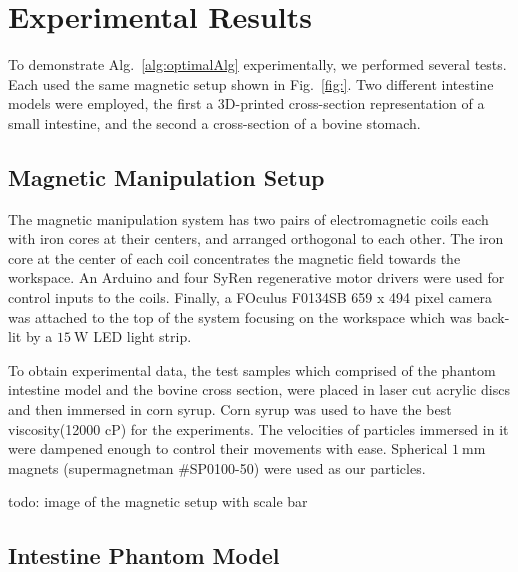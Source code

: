 \section{Experimental Results}\label{sec:expResults}

To demonstrate Alg.~\ref{alg:optimalAlg} experimentally, we performed several tests.
Each used the same magnetic setup shown in Fig.~\ref{fig:}.
 Two different intestine models were employed, the first a 3D-printed cross-section representation of a small intestine, and the second a cross-section of a bovine stomach.
 
 \subsection{Magnetic Manipulation Setup}
 
 The magnetic manipulation system has two pairs of electromagnetic coils each with iron cores at their centers, and arranged orthogonal to each other. The iron core at the center of each coil concentrates the magnetic field towards the workspace. An Arduino and four SyRen regenerative motor drivers were used for control inputs to the coils. Finally, a FOculus F0134SB 659 x 494 pixel camera was attached to the top of the system focusing on the workspace which was back-lit by a $\SI{15}{\watt}$ LED light strip. 
 
To obtain experimental data, the test samples which comprised of the phantom intestine model and the bovine cross section, were placed in laser cut acrylic discs and then immersed in corn syrup. Corn syrup was used to have the best viscosity(12000 cP) for the experiments. The velocities of particles immersed in it were dampened enough to control their movements with ease. Spherical $\SI{1}{\milli\metre}$ magnets (supermagnetman \#SP0100-50) were used as our particles.
 

todo: image of the magnetic setup with scale bar


\subsection{Intestine Phantom Model}

